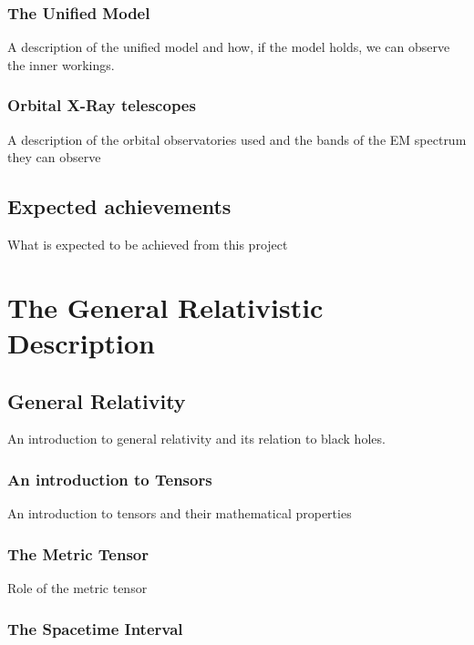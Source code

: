 \documentclass[12pt, oneside]{smuthesis}
\begin{document}
\subsection{\sc The Unified Model}

A description of the unified model and how, if the model holds, we can observe the inner workings.

\subsection{\sc Orbital X-Ray telescopes}

A description of the orbital observatories used and the bands of the EM spectrum they can observe

\section{\sc Expected achievements}

What is expected to be achieved from this project

\newpage

\chapter{\sc The General Relativistic Description}

\section{\sc General Relativity}

An introduction to general relativity and its relation to black holes.

\subsection{\sc An introduction to Tensors}

An introduction to tensors and their mathematical properties

\subsection{\sc The Metric Tensor}

Role of the metric tensor

\subsection{\sc The Spacetime Interval}
\end{document}
